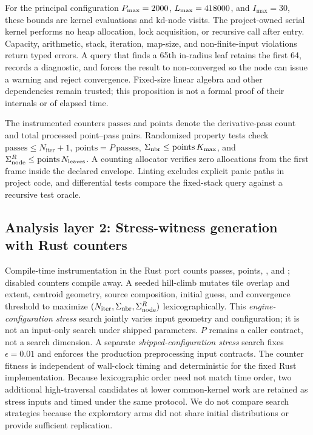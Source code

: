 For the principal configuration $P_{\max}=2000$,
$L_{\max}=418000$, and $I_{\max}=30$, these bounds are
\runtimeKernelEvalMax{} kernel evaluations and \runtimeKdVisitMax{} kd-node visits. The project-owned serial kernel performs no heap allocation,
lock acquisition, or recursive call after entry. Capacity, arithmetic, stack, iteration,
map-size, and non-finite-input violations return typed errors. A query that finds a 65th
in-radius leaf retains the first 64, records a diagnostic, and forces the result to
non-converged so the node can issue a warning and reject convergence. Fixed-size linear
algebra and other dependencies remain trusted; this proposition is not a formal proof of
their internals or of elapsed time.

The instrumented counters \(\mathrm{passes}\) and \(\mathrm{points}\) denote the
derivative-pass count and total processed point--pass pairs. Randomized property tests check
$\mathrm{passes}\le N_{\mathrm{iter}}+1$,
$\mathrm{points}=P\,\mathrm{passes}$,
$\Sigma_{\mathrm{nbr}}\le\mathrm{points}\,K_{\max}$, and
$\Sigma_{\mathrm{node}}^{R}\le\mathrm{points}\,N_{\mathrm{leaves}}$. A counting allocator verifies zero
allocations from the first frame inside the declared envelope. Linting excludes explicit
panic paths in project code, and differential tests compare the fixed-stack query against
a recursive test oracle.

\subsection{Analysis layer 2: Stress-witness generation with Rust counters}
\label{sec:meth-search}
Compile-time instrumentation in the Rust port counts passes, points, \sumnbr, and
\kdnodes; disabled counters compile away. A seeded hill-climb mutates tile overlap and
extent, centroid geometry, source composition, initial guess, and convergence threshold to
maximize $(N_{\mathrm{iter}},\Sigma_{\mathrm{nbr}},\Sigma_{\mathrm{node}}^{R})$ lexicographically. This
\emph{engine-configuration stress} search jointly varies input geometry and configuration;
it is not an input-only search under shipped parameters. $P$ remains a caller contract,
not a search dimension. A separate \emph{shipped-configuration stress} search fixes
$\epsilon=0.01$ and enforces the production preprocessing input contracts. The counter
fitness is independent of wall-clock timing and deterministic for the fixed Rust
implementation. Because lexicographic order need not match time order, two additional
high-traversal candidates at lower common-kernel work are retained as stress inputs and
timed under the same protocol. We do not compare
search strategies because the exploratory arms did not share initial distributions or provide
sufficient replication.

